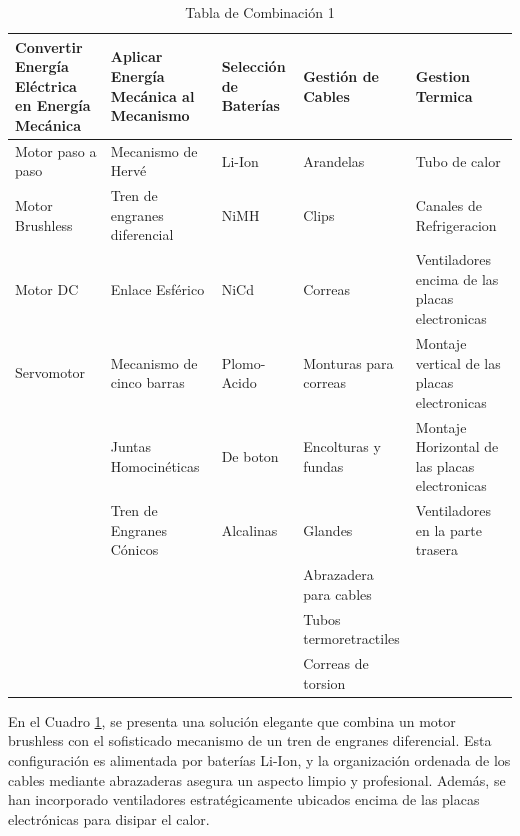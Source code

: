     \begin{table}[H]
    \centering
    \begin{tabularx}{\textwidth}{|X|X|X|X|X|}
    \hline
    \textbf{Convertir Energía Eléctrica en Energía Mecánica} & \textbf{Aplicar Energía Mecánica al Mecanismo} & \textbf{Selección de Baterías} & \textbf{Gestión de Cables} & \textbf{Gestion Termica} \\
    \hline
    Motor paso a paso & Mecanismo de Hervé & \cellcolor{green}Li-Ion  & Arandelas & Tubo de calor\\
    \hline
    \cellcolor{green}Motor Brushless & \cellcolor{green}Tren de engranes diferencial & NiMH & Clips & Canales de Refrigeracion \\
    \hline
    Motor DC & Enlace Esférico & NiCd & Correas & \cellcolor{green}Ventiladores encima de las placas electronicas\\
    \hline
    Servomotor & Mecanismo de cinco barras & Plomo-Acido & Monturas para correas & Montaje vertical de las placas electronicas\\
    \hline
     & Juntas Homocinéticas & De boton & Encolturas y fundas & Montaje Horizontal de las placas electronicas\\
    \hline
     & Tren de Engranes Cónicos & Alcalinas & Glandes & Ventiladores en la parte trasera\\
    \hline
     & & & \cellcolor{green}Abrazadera para cables & \\
    \hline
     & & & Tubos termoretractiles & \\
    \hline
     & & & Correas de torsion & \\
    \hline
    \end{tabularx}
    \caption{Tabla de Combinación 1}
    \label{tab:combinacion_1}
    \end{table}

    En el Cuadro \ref{tab:combinacion_1}, se presenta una solución elegante que combina un motor brushless con el sofisticado mecanismo de un tren de engranes diferencial. Esta configuración es alimentada por baterías Li-Ion, y la organización ordenada de los cables mediante abrazaderas asegura un aspecto limpio y profesional. Además, se han incorporado ventiladores estratégicamente ubicados encima de las placas electrónicas para disipar el calor.
    
